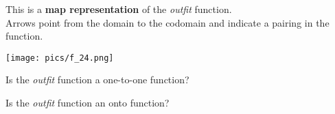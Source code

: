\documentclass{ximera}
\begin{document}
\begin{exercise}


This is a \textbf{map representation} of the \textit{outfit} function. \\

Arrows point from the domain to the codomain and indicate a pairing in the function.

\begin{image}
\texttt{[image: pics/f\_24.png]}
\end{image}


\begin{question}
Is the \textit{outfit} function a one-to-one function?

\begin{multipleChoice}
\end{multipleChoice}
\end{question}






\begin{question}
Is the \textit{outfit} function an onto function?

\begin{multipleChoice}
\end{multipleChoice}
\end{question}


\end{exercise}
\end{document}
